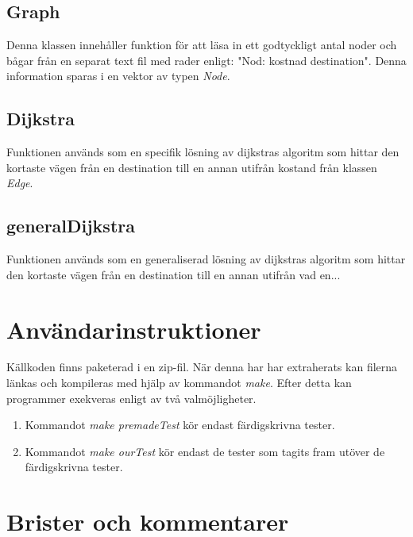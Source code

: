 \documentclass[12pt]{article}
\begin{document}
\subsection*{Graph}
Denna klassen innehåller funktion för att läsa in ett godtyckligt antal noder och bågar från en separat text fil med rader enligt: "Nod: kostnad destination". Denna information sparas i en vektor av typen \textit{Node}.

\subsection*{Dijkstra}
Funktionen används som en specifik lösning av dijkstras algoritm som hittar den kortaste vägen från en destination till en annan utifrån kostand från klassen \textit{Edge}.

\subsection*{generalDijkstra}
Funktionen används som en generaliserad lösning av dijkstras algoritm som hittar den kortaste vägen från en destination till en annan utifrån vad en...

\section*{Användarinstruktioner}
Källkoden finns paketerad i en zip-fil. När denna har har extraherats kan filerna länkas och kompileras med hjälp av kommandot \textit{make}. Efter detta kan programmer exekveras enligt av två valmöjligheter.
\begin{enumerate}
    \item Kommandot \textit{make premadeTest} kör endast färdigskrivna tester.
    \item Kommandot \textit{make ourTest} kör endast de tester som tagits fram utöver de färdigskrivna tester. 
\end{enumerate}


\section*{Brister och kommentarer}










\end{document}

